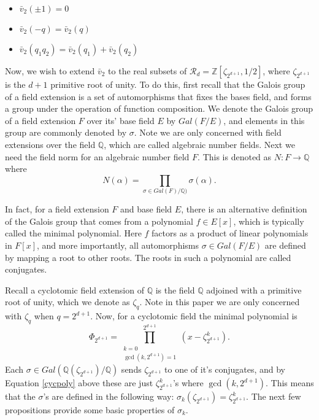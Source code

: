 \documentclass[12pt]{dalthesis}
\begin{document}
\begin{proposition} \hspace{10mm}
\begin{itemize}
\item $\bar{v}_2(\pm 1) = 0$
\item $\bar{v}_2 (-q) = \bar{v}_2 (q)$
\item $\bar{v}_2(q_1q_2) = \bar{v}_2 (q_1) + \bar{v}_2 (q_2)$
\end{itemize}
\end{proposition}

Now, we wish to extend $\bar{v}_2$ to the real subsets of $\mathcal{R}_d = \mathbb{Z}[\zeta_{2^{d+1}}, 1/2]$, where $\zeta_{2^{d+1}}$ is the $d+1$ primitive root of unity. To do this, first recall that the Galois group of a field extension is a set of automorphisms that fixes the bases field, and forms a group under the operation of function composition. We denote the Galois group of a field extension $F$ over its' base field $E$ by $Gal(F/E)$, and elements in this group are commonly denoted by $\sigma$. Note we are only concerned with field extensions over the field $\mathbb{Q}$, which are called algebraic number fields. Next we need the field norm for an algebraic number field $F$. This is denoted as $N: F \longrightarrow \mathbb{Q}$ where
\begin{equation*}
N (\alpha) = \prod\limits_{\sigma \in Gal(F)/\mathbb{Q})} \sigma (\alpha). 
\end{equation*} 

In fact, for a field extension $F$ and base field $E$, there is an alternative definition of the Galois group that comes from a polynomial $f \in E[x]$, which is typically called the minimal polynomial. Here $f$ factors as a product of linear polynomials in $F[x]$, and more importantly, all automorphisms $\sigma \in Gal(F/E)$ are defined by mapping a root to other roots. The roots in such a polynomial are called conjugates. 

Recall a cyclotomic field extension of $\mathbb{Q}$ is the field $\mathbb{Q}$ adjoined with a primitive root of unity, which we denote as $\zeta_q$. Note in this paper we are only concerned with $\zeta_q$ when $q = 2^{d+1}$. Now, for a cyclotomic field the minimal polynomial is 
\begin{equation}
\label{cycpoly}
\Phi_{2^{d+1}} = \prod\limits_{\substack{k = 0 \\ \gcd (k, 2^{d+1}) = 1}}^{2^{d+1}} (x-\zeta_{2^{d+1}}^k).
\end{equation}
Each $\sigma \in Gal(\mathbb{Q}(\zeta_{2^{d+1}})/\mathbb{Q})$ sends $\zeta_{2^{d+1}}$ to one of it's conjugates, and by Equation \ref{cycpoly} above these are just $\zeta_{2^{d+1}}^k$'s where $\gcd (k, 2^{d+1})$. This means that the $\sigma$'s are defined in the following way: $\sigma_k (\zeta_{2^{d+1}}) = \zeta_{2^{d+1}}^k$. The next few propositions provide some basic properties of $\sigma_k$.
\end{document}
